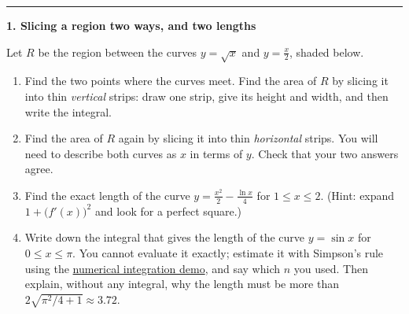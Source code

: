 \documentclass[11pt]{article}
\newcommand{\prob}[1]{\medskip\noindent\textbf{\large #1}\par\smallskip}
\begin{document}
\bigskip\hrule\bigskip
\prob{1. Slicing a region two ways, and two lengths}
Let $R$ be the region between the curves $y=\sqrt x$ and $y=\frac x2$, shaded below.
\begin{center}
\end{center}
\begin{enumerate}
\item Find the two points where the curves meet. Find the area of $R$ by slicing it into
thin \emph{vertical} strips: draw one strip, give its height and width, and then write
the integral.

\item Find the area of $R$ again by slicing it into thin \emph{horizontal} strips. You will
need to describe both curves as $x$ in terms of $y$. Check that your two answers agree.

\item Find the exact length of the curve $y=\frac{x^2}2-\frac{\ln x}4$ for $1\le x\le2$. (Hint:
expand $1+\big(f'(x)\big)^2$ and look for a perfect square.)

\item Write down the integral that gives the length of the curve $y=\sin x$ for
$0\le x\le\pi$. You cannot evaluate it exactly; estimate it with Simpson's rule using
the \href{https://e-infinity.space/numerical-integration/}{numerical integration demo},
and say which $n$ you used. Then explain, without any integral, why the length must be
more than $2\sqrt{\pi^2/4+1}\approx3.72$.

\end{enumerate}
\end{document}
